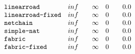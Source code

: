 \[\begin{array}{l l l l l l l l}
    \texttt{linearroad} & inf &  & \infty & 0  &  & 0.0 \\

    \texttt{linearroad-fixed} & inf &  & \infty & 0  &  & 0.0 \\

    \texttt{netchain} & inf &  & \infty & 0  &  & 0.0 \\

    \texttt{simple-nat} & inf &  & \infty & 0  &  & 0.0 \\

    \texttt{fabric} & inf &  & \infty & 0  &  & 0.0 \\

    \texttt{fabric-fixed} & inf &  & \infty & 0  &  & 0.0 \\
\end{array}\]
